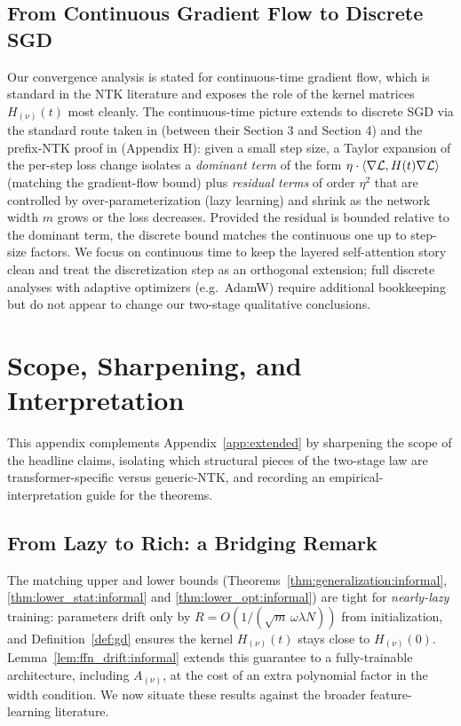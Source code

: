 \documentclass[11pt]{article}
\let\citet\citep
\theoremstyle{plain}
\begin{document}
\subsection{From Continuous Gradient Flow to Discrete SGD}\label{app_sub:discrete_sgd}

Our convergence analysis is stated for continuous-time gradient flow, which is standard in the NTK literature \citep{jgh18, dzps19} and exposes the role of the kernel matrices $H_{(\nu)}(t)$ most cleanly. The continuous-time picture extends to discrete SGD via the standard route taken in \citet{dzps19} (between their Section 3 and Section 4) and the prefix-NTK proof in \citet{lssy25} (Appendix H): given a small step size, a Taylor expansion of the per-step loss change isolates a {\it dominant term} of the form $\eta \cdot \langle\nabla {\cal L}, H(t)\nabla {\cal L}\rangle$ (matching the gradient-flow bound) plus {\it residual terms} of order $\eta^2$ that are controlled by over-parameterization (lazy learning) and shrink as the network width $m$ grows or the loss decreases. Provided the residual is bounded relative to the dominant term, the discrete bound matches the continuous one up to step-size factors. We focus on continuous time to keep the layered self-attention story clean and treat the discretization step as an orthogonal extension; full discrete analyses with adaptive optimizers (e.g.~AdamW) require additional bookkeeping but do not appear to change our two-stage qualitative conclusions.

\section{Scope, Sharpening, and Interpretation}\label{app:scope}

This appendix complements Appendix~\ref{app:extended} by sharpening the scope of the headline claims, isolating which structural pieces of the two-stage law are transformer-specific versus generic-NTK, and recording an empirical-interpretation guide for the theorems.

\subsection{From Lazy to Rich: a Bridging Remark}\label{app_sub:lazy_to_rich}

The matching upper and lower bounds (Theorems~\ref{thm:generalization:informal}, \ref{thm:lower_stat:informal} and \ref{thm:lower_opt:informal}) are tight for {\it nearly-lazy} training: parameters drift only by $R = O(1/(\sqrt{m}\,\omega\lambda N))$ from initialization, and Definition~\ref{def:gd} ensures the kernel $H_{(\nu)}(t)$ stays close to $H_{(\nu)}(0)$. Lemma~\ref{lem:ffn_drift:informal} extends this guarantee to a fully-trainable architecture, including $A_{(\nu)}$, at the cost of an extra polynomial factor in the width condition. We now situate these results against the broader feature-learning literature.
\end{document}
